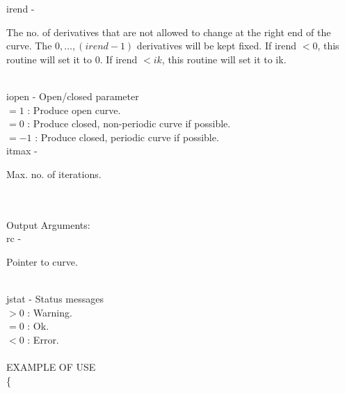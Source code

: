         \>\>    {\fov irend}\> - \>  \begin{minipg2}
                     The no. of derivatives that are not allowed to change
                 at the right end of the curve.
                 The $0,\ldots,(irend-1)$ derivatives will be kept fixed.
                 If irend $<0$, this routine will set it to 0.
                 If irend $<ik$, this routine will set it to ik.
                               \end{minipg2}\\[0.8ex]
        \>\>    {\fov iopen}\> - \>  Open/closed parameter\\
            \>\>\>\>  $= 1$  : Produce open curve.\\
            \>\>\>\>  $= 0$ : Produce closed, non-periodic curve if possible.\\
            \>\>\>\>  $= -1$ : Produce closed, periodic curve if possible.\\
        \>\>    {\fov itmax}\> - \>  \begin{minipg2}
                     Max. no. of iterations.
                               \end{minipg2}\\
\\
	\>Output Arguments:\\
        \>\>    {\fov rc}\> - \>  \begin{minipg2}
                     Pointer to curve.
                               \end{minipg2}\\
        \>\>    {\fov jstat}     \> - \> Status messages\\
                \>\>\>\>\>              $> 0$   : Warning.\\
                \>\>\>\>\>              $= 0$   : Ok.\\
                \>\>\>\>\>              $< 0$   : Error.\\
\\
EXAMPLE OF USE\\
		\>      \{ \\

